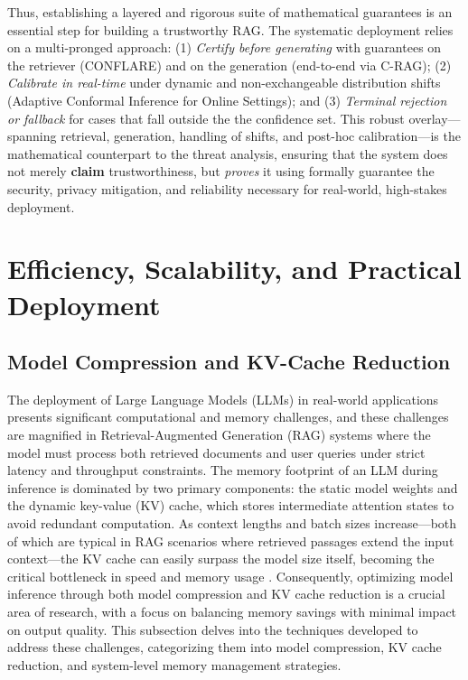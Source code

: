 \documentclass[11pt]{article}
\begin{document}
Thus, establishing a layered and rigorous suite of mathematical guarantees is an essential step for building a trustworthy RAG. The systematic deployment relies on a multi-pronged approach: (1) \emph{Certify before generating} with guarantees on the retriever (CONFLARE) and on the generation (end-to-end via C-RAG); (2) \emph{Calibrate in real-time} under dynamic and non-exchangeable distribution shifts (Adaptive Conformal Inference for Online Settings); and (3) \emph{Terminal rejection or fallback} for cases that fall outside the the confidence set. This robust overlay---spanning retrieval, generation, handling of shifts, and post-hoc calibration---is the mathematical counterpart to the threat analysis, ensuring that the system does not merely \textbf{claim} trustworthiness, but \emph{proves} it using formally guarantee the security, privacy mitigation, and reliability necessary for real-world, high-stakes deployment.

\section{Efficiency, Scalability, and Practical Deployment}

\subsection{Model Compression and KV-Cache Reduction}

The deployment of Large Language Models (LLMs) in real-world applications presents significant computational and memory challenges, and these challenges are magnified in Retrieval-Augmented Generation (RAG) systems where the model must process both retrieved documents and user queries under strict latency and throughput constraints. The memory footprint of an LLM during inference is dominated by two primary components: the static model weights and the dynamic key-value (KV) cache, which stores intermediate attention states to avoid redundant computation. As context lengths and batch sizes increase---both of which are typical in RAG scenarios where retrieved passages extend the input context---the KV cache can easily surpass the model size itself, becoming the critical bottleneck in speed and memory usage \cite{ref298,ref299}. Consequently, optimizing model inference through both model compression and KV cache reduction is a crucial area of research, with a focus on balancing memory savings with minimal impact on output quality. This subsection delves into the techniques developed to address these challenges, categorizing them into model compression, KV cache reduction, and system-level memory management strategies.
\end{document}
